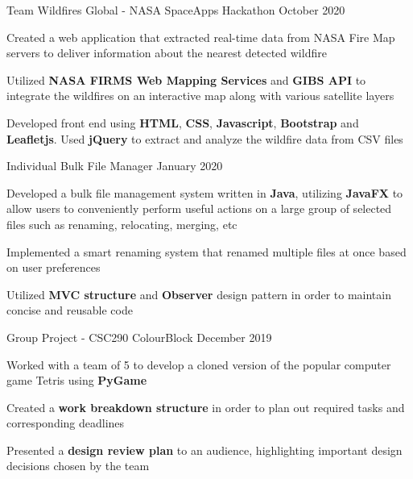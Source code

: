 
\begin{cventries}

    \cventry
        {Team} %
        {Wildfires Global - NASA SpaceApps Hackathon} %
        {} %
        {October 2020} %
        {
          \begin{cvitems} %
            \item Created a web application that extracted real-time data from NASA Fire Map servers to deliver information about the nearest detected wildfire
            \item Utilized \textbf{NASA FIRMS Web Mapping Services} and \textbf{GIBS API} to integrate the wildfires on an interactive map along with various satellite layers
            \item Developed front end using \textbf{HTML}, \textbf{CSS}, \textbf{Javascript}, \textbf{Bootstrap} and \textbf{Leafletjs}. Used \textbf{jQuery} to extract and analyze the wildfire data from CSV files
          \end{cvitems}
        }

  \cventry
    {Individual} %
    {Bulk File Manager} %
    {} %
    {January 2020} %
    {
      \begin{cvitems} %
        \item {Developed a bulk file management system written in \textbf{Java}, utilizing \textbf{JavaFX} to allow users to conveniently perform useful actions on a large group of selected files such as renaming, relocating, merging, etc}
		\item {Implemented a smart renaming system that renamed multiple files at once based on user preferences}
		\item {Utilized \textbf{MVC structure} and \textbf{Observer} design pattern in order to maintain concise and reusable code}
      \end{cvitems}
    }

  \cventry
    {Group Project - CSC290} %
    {ColourBlock} %
    {} %
    {December 2019} %
    {
      \begin{cvitems} %
      	\item {Worked with a team of 5 to develop a cloned version of the popular computer game Tetris using \textbf{PyGame}}
		\item {Created a \textbf{work breakdown structure} in order to plan out required tasks and corresponding deadlines}
		\item {Presented a \textbf{design review plan} to an audience, highlighting important design decisions chosen by the team}
      \end{cvitems}
    }
    

\end{cventries}
